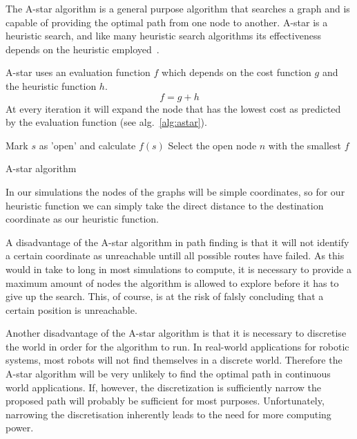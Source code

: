 			The A-star algorithm is a general purpose algorithm that searches a graph and is capable of providing the optimal path from one node to another. A-star is a heuristic search, and like many heuristic search algorithms its effectiveness depends on the heuristic employed~\cite{4082128}.

			A-star uses an evaluation function $f$ which depends on the cost function $g$ and the heuristic function $h$.
			\begin{equation}
				\label{eq:astarevaluation}
			 	f = g + h
			\end{equation} 
			At every iteration it will expand the node that has the lowest cost as predicted by the evaluation function (see alg.~\ref{alg:astar}).

			\begin{algorithm}
				Mark $s$ as 'open' and calculate $f(s)$\;
				Select the open node $n$ with the smallest $f$\;
				\caption{A-star algorithm~\protect\cite{4082128}}
				\label{alg:astar}
			\end{algorithm}

			In our simulations the nodes of the graphs will be simple coordinates, so for our heuristic function we can simply take the direct distance to the destination coordinate as our heuristic function.

			A disadvantage of the A-star algorithm in path finding is that it will not identify a certain coordinate as unreachable untill all possible routes have failed. As this would in take to long in most simulations to compute, it is necessary to provide a maximum amount of nodes the algorithm is allowed to explore before it has to give up the search. This, of course, is at the risk of falsly concluding that a certain position is unreachable.

			Another disadvantage of the A-star algorithm is that it is necessary to discretise the world in order for the algorithm to run. In real-world applications for robotic systems, most robots will not find themselves in a discrete world. Therefore the A-star algorithm will be very unlikely to find the optimal path in continuous world applications. If, however, the discretization is sufficiently narrow the proposed path will probably be sufficient for most purposes. Unfortunately, narrowing the discretisation inherently leads to the need for more computing power.

